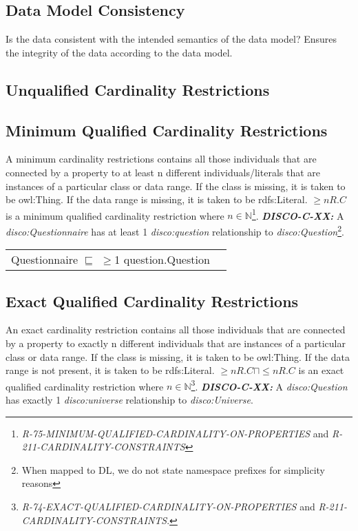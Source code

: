 \documentclass{llncs}
\newenvironment{DL}{
  \vspace{0cm}
  \begin{tabular}{r l}

}{
  \end{tabular}
}
\begin{document}
\subsection{Data Model Consistency}

Is the data consistent with the intended semantics of the data model?
Ensures the integrity of the data according to the data model.

\subsection{Unqualified Cardinality Restrictions}

\subsection{Minimum Qualified Cardinality Restrictions}

A minimum cardinality restrictions contains all those individuals that are connected by a property to at least n different individuals/literals 
that are instances of a particular class or data range. If the class is missing, it is taken to be owl:Thing. 
If the data range is missing, it is taken to be rdfs:Literal.
$\geq n R. C$ is a minimum qualified cardinality restriction where $n \in \mathbb{N}$\footnote{{\em R-75-MINIMUM-QUALIFIED-CARDINALITY-ON-PROPERTIES} and {\em R-211-CARDINALITY-CONSTRAINTS}}.
\textbf{{\em DISCO-C-XX:}}
A {\em disco:Questionnaire} has at least 1 {\em disco:question} relationship to {\em disco:Question}\footnote{When mapped to DL, we do not state namespace prefixes for simplicity reasons}.

\begin{DL}
Questionnaire $\sqsubseteq$ $\geq$1 question.Question
\end{DL}

\subsection{Exact Qualified Cardinality Restrictions}

An exact cardinality restriction contains all those individuals that are connected by a property to exactly n different individuals that are instances of a particular class or data range. 
If the class is missing, it is taken to be owl:Thing. 
If the data range is not present, it is taken to be rdfs:Literal.
$\geq n R. C \sqcap \leq n R. C $ is an exact qualified cardinality restriction where $n \in \mathbb{N}$\footnote{{\em R-74-EXACT-QUALIFIED-CARDINALITY-ON-PROPERTIES} and {\em R-211-CARDINALITY-CONSTRAINTS}.}.
\textbf{{\em DISCO-C-XX:}}
A {\em disco:Question} has exactly 1 {\em disco:universe} relationship to {\em disco:Universe}.
\end{document}
